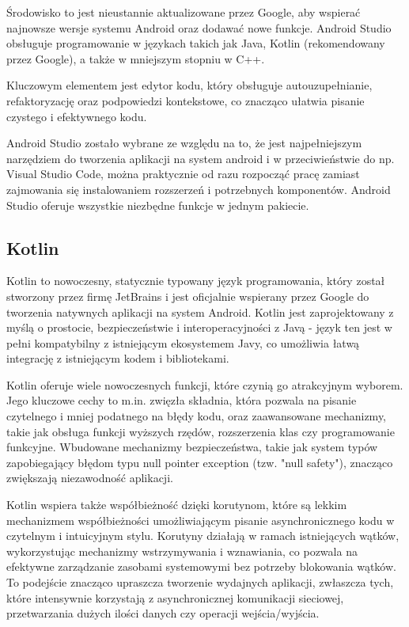 \documentclass[12pt,twoside]{article}
\begin{document}
Środowisko to jest nieustannie aktualizowane przez Google, aby wspierać najnowsze wersje systemu Android
oraz dodawać nowe funkcje. Android Studio obsługuje programowanie w językach takich jak Java, Kotlin 
(rekomendowany przez Google), a także w mniejszym stopniu w C++.

Kluczowym elementem jest edytor kodu, który obsługuje autouzupełnianie, refaktoryzację oraz podpowiedzi 
kontekstowe, co znacząco ułatwia pisanie czystego i efektywnego kodu.

Android Studio zostało wybrane ze względu na to, że jest najpełniejszym narzędziem do tworzenia aplikacji
na system android i w przeciwieństwie do np. Visual Studio Code, można praktycznie od razu rozpocząć
pracę zamiast zajmowania się instalowaniem rozszerzeń i potrzebnych komponentów. Android Studio oferuje 
wszystkie niezbędne funkcje w jednym pakiecie.

\subsection{Kotlin}

Kotlin to nowoczesny, statycznie typowany język programowania, który został stworzony przez firmę 
JetBrains i jest oficjalnie wspierany przez Google do tworzenia natywnych aplikacji na system Android. 
Kotlin jest zaprojektowany z myślą o prostocie, bezpieczeństwie i interoperacyjności z Javą - język ten 
jest w pełni kompatybilny z istniejącym ekosystemem Javy, co umożliwia łatwą integrację z istniejącym kodem i 
bibliotekami.

Kotlin oferuje wiele nowoczesnych funkcji, które czynią go atrakcyjnym wyborem. Jego kluczowe 
cechy to m.in. zwięzła składnia, która pozwala na pisanie czytelnego i mniej podatnego na błędy kodu, oraz 
zaawansowane mechanizmy, takie jak obsługa funkcji wyższych rzędów, rozszerzenia klas czy programowanie funkcyjne. 
Wbudowane mechanizmy bezpieczeństwa, takie jak system typów zapobiegający błędom typu null pointer exception 
(tzw. "null safety"), znacząco zwiększają niezawodność aplikacji.

Kotlin wspiera także współbieżność dzięki korutynom, które są lekkim mechanizmem współbieżności umożliwiającym 
pisanie asynchronicznego kodu w czytelnym i intuicyjnym stylu. Korutyny działają w ramach istniejących wątków, 
wykorzystując mechanizmy wstrzymywania i wznawiania, co pozwala na efektywne zarządzanie zasobami systemowymi bez 
potrzeby blokowania wątków. To podejście znacząco upraszcza tworzenie wydajnych aplikacji, zwłaszcza tych, które 
intensywnie korzystają z asynchronicznej komunikacji sieciowej, przetwarzania dużych ilości danych czy operacji 
wejścia/wyjścia.
\end{document}
